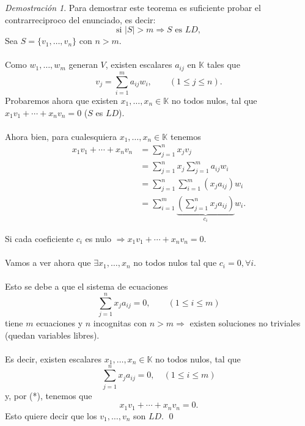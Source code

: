 \documentclass{article}
\theoremstyle{definition}
\theoremstyle{definition}
\theoremstyle{remark}
\newtheorem*{demo}{Demostración}
\begin{document}
\begin{demo}
  Para demostrar este teorema es suficiente probar el contrarreciproco del enunciado, es decir: \[
    \text{si } |S| > m \Rightarrow S \text{ es } LD,
  \]
  Sea $S = \{v_1, \dots ,v_n\}$ con $n > m$. \\\\ Como $w_1, \dots ,w_m$ generan $V$, existen escalares $a_{ij}$ en $\mathbb{K}$ tales que \[
    v_{j}=\sum_{i=1}^{m}a_{ij}w_{i},  \quad \quad (1\leq j \leq n).
  \]
  Probaremos ahora que existen $x_1, \dots ,x_n \in \mathbb{K}$ no todos nulos, tal que \\ $x_1v_1 + \cdots + x_nv_n=0$ ($S$ es $LD$). \\\\ Ahora bien, para cualesquiera $x_1,\dots ,x_n \in \mathbb{K}$ tenemos \begin{align*}
    x_1v_1 + \cdots + x_n v_n &= \sum_{j=1}^{n}x_jv_j \\
                           &= \sum_{j=1}^{n}x_{j}\sum_{j=1}^{m}a_{ij}w_{i} \\ 
                           &= \sum_{j=1}^{n}\sum_{i=1}^m(x_{j}a_{ij})w_{i} \\
                           &= \sum_{i=1}^{m}\underbrace{\left(\sum_{j=1}^{n}x_{j}a_{ij}\right)}_{c_i}w_i.   \tag{*}\end{align*}

                           Si cada coeficiente $c_i$ es nulo $\Rightarrow x_1 v_1 + \cdots + x_n v_n =0$. \\\\ Vamos a ver ahora que $\exists x_1, \dots ,x_n$ no todos nulos tal que $c_i=0,\forall i$.  \\\\ Esto se debe a que el sistema de ecuaciones \[
                          \sum_{j=1}^{n}x_{j}a_{ij}=0, \quad \quad (1 \leq i \leq m)
                        \]
                        tiene $m$ ecuaciones y $n$ incognitas con $n>m \Rightarrow $ existen soluciones no triviales (quedan variables libres). \\\\ Es decir, existen escalares $x_1, \dots, x_n \in \mathbb{K}$ no todos nulos, tal que \[
                          \sum_{j=1}^{n}x_ja_{ij}=0, \quad (1 \leq i \leq m) 
                        \]
                        y, por (*), tenemos que \[
x_1v_1+\cdots + x_n v_n=0. 
                        \]
                        Esto quiere decir que los $v_1, \dots ,v_n$ son $LD$. \qed 
                        \end{demo}
                        \pagebreak
\end{document}
